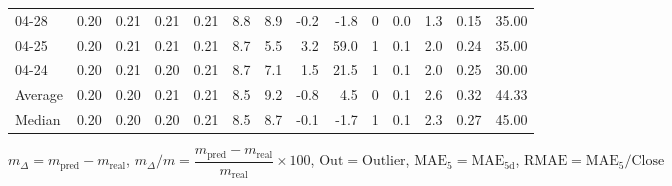 \begin{threeparttable}
{\begin{tabular}{lrrrrrrrrrrrrr}
  04-28 &          0.20 &          0.21 &          0.21 &        0.21 &                 8.8 &                 8.9 &       -0.2 &         -1.8 &              0 &                 0.0 &              1.3 &            0.15 &                  35.00 \\
  04-25 &          0.20 &          0.21 &          0.21 &        0.21 &                 8.7 &                 5.5 &        3.2 &         59.0 &              1 &                 0.1 &              2.0 &            0.24 &                  35.00 \\
  04-24 &          0.20 &          0.21 &          0.20 &        0.21 &                 8.7 &                 7.1 &        1.5 &         21.5 &              1 &                 0.1 &              2.0 &            0.25 &                  30.00 \\
Average &          0.20 &          0.20 &          0.21 &        0.21 &                 8.5 &                 9.2 &       -0.8 &          4.5 &              0 &                 0.1 &              2.6 &            0.32 &                  44.33 \\
 Median &          0.20 &          0.20 &          0.20 &        0.21 &                 8.5 &                 8.7 &       -0.1 &         -1.7 &              1 &                 0.1 &              2.3 &            0.27 &                  45.00 \\
\bottomrule
\end{tabular}
}
\begin{tablenotes}\footnotesize
\item $m_\Delta=m_{\text{pred}}-m_{\text{real}}$,
$m_\Delta/m=\dfrac{m_{\text{pred}}-m_{\text{real}}}{m_{\text{real}}}\times100$,
$\mathrm{Out}=\text{Outlier}$,
$\mathrm{MAE}_5=\mathrm{MAE}_{5\text{d}}$,
$\mathrm{RMAE}=\mathrm{MAE}_5/\text{Close}$
\end{tablenotes}
\end{threeparttable}
\endgroup

